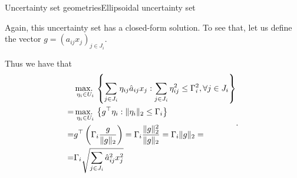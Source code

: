 %
%
%		
%
\begin{frame}{Uncertainty set geometries}{Ellipsoidal uncertainty set \cite{ben1999robust}}

	Again, this uncertainty set has a \alert{closed-form} solution. To see that, let us define the vector $g = (a_{ij}x_j)_{j \in J_i}$.
	
	Thus we have that  
	\begin{equation*}
		\begin{aligned}
			  & \mathop{\text{max.} \ }_{\eta_i \in U_i}\left\{ \sum_{j \in J_i} \eta_{ij}\hat{a}_{ij}x_j : \sum_{j \in J_i} \eta_{ij}^2 \le \Gamma_i^2, \forall j \in J_i \right \} \\
			= & \mathop{\text{max.} \ }_{\eta_i \in U_i}\left\{ g^\top \eta_i : \| \eta_i \|_2 \le \Gamma_i \right \} \\	
			= &  g^\top\left(\Gamma_i\frac{g}{\|g\|_2}\right) = \Gamma_i \frac{\|g\|^2_2}{\|g\|_2} = \Gamma_i\|g\|_2 =\\
			= & \Gamma_i \sqrt{\sum_{j \in J_i} \hat{a}_{ij}^2 x_j^2}
		\end{aligned}.
		\end{equation*}
		
\end{frame}


